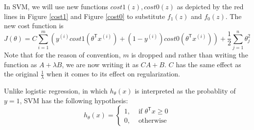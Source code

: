 In SVM, we will use new functions $cost1(z), cost0(z)$ as depicted by the red lines in Figure \ref{cost1} and Figure \ref{cost0} to substitute $f_1(z)$ and $f_0(z)$. The new cost function is 
\begin{equation}
J(\theta) = C\sum\limits_{i=1}^{m}\left(y^{(i)}cost1(\theta^{\mathsf T}x^{(i)}) + (1-y^{(i)})cost0(\theta^{\mathsf T}x^{(i)})\right) + \frac{1}{2}\sum\limits_{j=1}^{n}\theta_j^{2}
\end{equation}
Note that for the reason of convention, $m$ is dropped and rather than writing the function as $A + \lambda B$, we are now writing it as $CA + B$. $C$ has the same effect as the original $\frac{1}{\lambda}$ when it comes to its effect on regularization.

Unlike logistic regression, in which $h_{\theta}(x)$ is interpreted as the probablity of $y=1$, SVM has the following hypothesis:
\begin{equation}
h_{\theta}(x) = \left\{
\begin{aligned}
1,& \text{ if } \theta^{\mathsf T}x \ge 0\\
0,& \text{ otherwise}
\end{aligned}
\right.
\end{equation}
